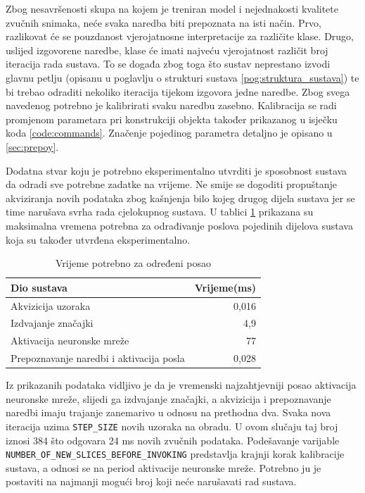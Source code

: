 Zbog nesavršenosti skupa na kojem je treniran model i nejednakosti kvalitete
zvučnih snimaka, neće svaka naredba biti prepoznata na isti način. Prvo, razlikovat će
se pouzdanost vjerojatnosne interpretacije za različite klase. Drugo, uslijed izgovorene
naredbe, klase će imati najveću vjerojatnost različit broj iteracija rada sustava.
To se događa zbog toga što sustav neprestano izvodi glavnu petlju (opisanu u poglavlju
o strukturi sustava \ref{pog:struktura_sustava}) te bi trebao odraditi nekoliko iteracija tijekom izgovora
jedne naredbe. Zbog svega navedenog potrebno je kalibrirati svaku naredbu zasebno.
Kalibracija se radi promjenom parametara pri konstrukciji objekta također prikazanog 
u isječku koda \ref{code:commands}. Značenje pojedinog  parametra detaljno je opisano u 
\ref{sec:prepoy}. 

Dodatna stvar koju je potrebno eksperimentalno utvrditi je sposobnost sustava da
odradi sve potrebne zadatke na vrijeme. Ne smije se dogoditi propuštanje akviziranja
novih podataka zbog kašnjenja bilo kojeg drugog dijela sustava jer se time narušava
svrha rada cjelokupnog sustava. U tablici \ref{tab:rts} prikazana su maksimalna
vremena potrebna za odrađivanje poslova pojedinih dijelova sustava koja su također
utvrđena eksperimentalno. 

\begin{table}[htb]
    \centering
    \begin{tabular}{|l|r|}
        \hline
        \textbf{Dio sustava} & \textbf{Vrijeme(ms)} \\ \hline
        Akvizicija uzoraka & 0,016\\ \hline
        Izdvajanje značajki & 4,9 \\ \hline
        Aktivacija neuronske mreže & 77 \\ \hline
        Prepoznavanje naredbi i aktivacija posla & 0,028 \\ \hline
    \end{tabular}
    \caption{Vrijeme potrebno za određeni posao}
    \label{tab:rts}
\end{table}

Iz prikazanih podataka
vidljivo je da je vremenski najzahtjevniji posao aktivacija neuronske mreže, slijedi ga 
izdvajanje značajki, a akvizicija i prepoznavanje naredbi imaju trajanje zanemarivo u odnosu
na prethodna dva. Svaka nova iteracija uzima \texttt{STEP\_SIZE} novih uzoraka na obradu. U ovom slučaju
taj broj iznosi 384 što odgovara 24 ms novih zvučnih podataka. Podešavanje varijable
\texttt{NUMBER\_OF\_NEW\_SLICES\_BEFORE\_INVOKING} predstavlja krajnji korak kalibracije sustava, a odnosi
se na period aktivacije neuronske mreže.
Potrebno ju je postaviti na najmanji mogući broj koji neće narušavati rad sustava. 

